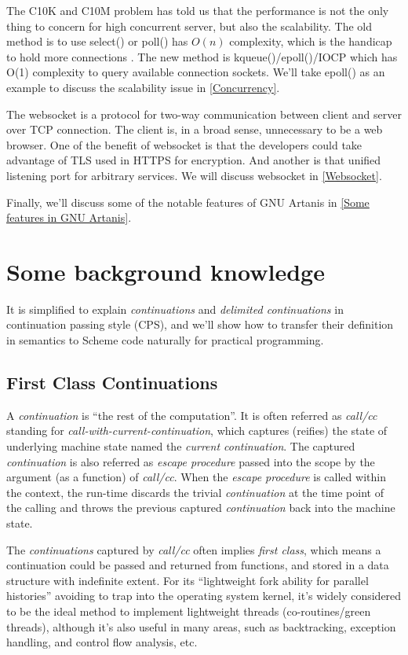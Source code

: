 \documentclass[numbers,numberedpars]{sigplanconf}
\begin{document}
The C10K and C10M problem has told us that the performance is not the only thing to concern for high concurrent server, but also the scalability.  
The old method is to use select() or poll() has $O(n)$ complexity, which is the handicap to hold more connections \citep{lemon2001kqueue}.
The new method is kqueue()/epoll()/IOCP which has O(1) complexity to query available connection sockets. We'll take epoll() as an example to
discuss the scalability issue in \ref{Concurrency}.

The websocket is a protocol for two-way communication between client and server over TCP connection. The client is, in a broad sense,
unnecessary to be a web browser. One of the benefit of websocket is that the developers could take advantage of TLS used in HTTPS for
encryption. And another is that unified listening port for arbitrary services. We will discuss websocket in \ref{Websocket}.

Finally, we'll discuss some of the notable features of GNU Artanis in \ref{Some features in GNU Artanis}.

\section{Some background knowledge}

It is simplified to explain {\it continuations} and {\it delimited continuations} in continuation passing style (CPS), and we'll show how to
transfer their definition in semantics to Scheme code naturally for practical programming.

\subsection{First Class Continuations}

A {\it continuation} is ``the rest of the computation''. It is often referred as {\it call/cc} standing for
{\it call-with-current-continuation}, which captures (reifies) the state of underlying machine state named the {\it current continuation}.
The captured {\it continuation} is also referred as {\it escape procedure} passed into the scope by the argument (as a function) of {\it call/cc}.
When the {\it escape procedure} is called within the context, the run-time discards the trivial
{\it continuation} at the time point of the calling and throws the previous captured {\it continuation} back into the machine state.

The {\it continuations} captured by {\it call/cc} often implies {\it first class}, which means a continuation
could be passed and returned from functions, and stored in a data structure with indefinite extent.
For its ``lightweight fork ability for parallel histories'' avoiding to trap into the operating system kernel, it's widely considered
to be the ideal method to implement lightweight threads (co-routines/green threads), although it's also useful in many areas, such as
backtracking, exception handling, and control flow analysis, etc.
\end{document}
